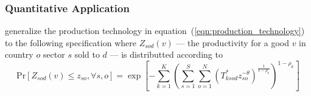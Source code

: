 \subsubsection{Quantitative Application}
\cite{Lind:2023} generalize the production technology in equation~(\ref{eqn:production_technology})
to the following specification where 
$Z_{sod}(v)$ --- the productivity for a good $v$ in country $o$ sector $s$ sold to $d$ ---
is distributted according to 
\begin{equation}
    \text{Pr}\left[Z_{s o d}(v) \leq z_{s o}, \forall s, o\right] = 
    \exp \left[-\sum_{k=1}^K\left(\sum_{s=1}^S \sum_{o=1}^N\left(T_{k s o d}^* z_{s o}^{-\theta}\right)^{\frac{1}{1-\rho_k}}\right)^{1-\rho_k}\right]
\end{equation}